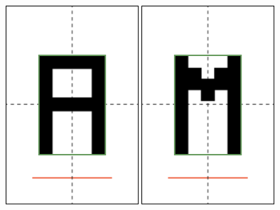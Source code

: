 \documentclass[letter, 11pt]{article}
\begin{document}
\begin{center}
  \includegraphics[height=20em]{A.png}
  \includegraphics[height=20em]{M.png}
\end{center}
\end{document}

